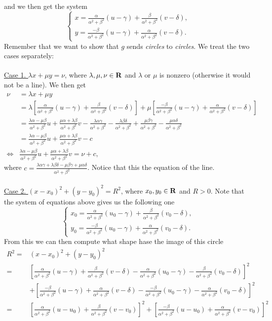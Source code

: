 \documentclass[11pt, a4paper, twoside]{article}
\begin{document}
	and we then get the system 
		$$\begin{cases}
			x = \frac{\alpha}{\alpha^2+\beta^2}(u-\gamma)+\frac{\beta}{\alpha^2+\beta^2}(v-\delta),\\
			y = \frac{-\beta}{\alpha^2+\beta^2}(u-\gamma)+\frac{\alpha}{\alpha^2+\beta^2}(v-\delta).
			\end{cases}$$
	Remember that we want to show that $g$ sends \emph{circles} to \emph{circles}. We treat the two cases separately:\\\\
	\underline{Case 1. $\lambda x+ \mu y = \nu$}, where $\lambda,\mu,\nu\in\mathbf{R}$ and $\lambda$ or $\mu$ is nonzero (otherwise it would not be a line). We then get
		\begin{align*}
			\nu&= \lambda x+\mu y\\
				&=\lambda[\frac{\alpha}{\alpha^2+\beta^2}(u-\gamma)+\frac{\beta}{\alpha^2+\beta^2}(v-\delta)]+\mu[\frac{-\beta}{\alpha^2+\beta^2}(u-\gamma)+\frac{\alpha}{\alpha^2+\beta^2}(v-\delta)]\\
			     &= \frac{\lambda\alpha-\mu\beta}{\alpha^2+\beta^2}u+\frac{\mu\alpha+\lambda\beta}{\alpha^2+\beta^2}v-\frac{\lambda\alpha\gamma}{\alpha^2+\beta^2}-\frac{\lambda\beta\delta}{\alpha^2+\beta^2}+\frac{\mu\beta\gamma}{\alpha^2+\beta^2}-\frac{\mu\alpha\delta}{\alpha^2+\beta^2}\\
			     &= \frac{\lambda\alpha-\mu\beta}{\alpha^2+\beta^2}u+\frac{\mu\alpha+\lambda\beta}{\alpha^2+\beta^2}v-c\\
			\iff&\frac{\lambda\alpha-\mu\beta}{\alpha^2+\beta^2}u+\frac{\mu\alpha+\lambda\beta}{\alpha^2+\beta^2}v=\nu+c,
		\end{align*}
		where $c=\frac{\lambda\alpha\gamma+\lambda\beta\delta-\mu\beta\gamma+\mu\alpha\delta}{\alpha^2+\beta^2}$. Notice that this the equation of the line.\\\\
	\underline{Case 2. $(x-x_0)^2+(y-y_0)^2=R^2$}, where $x_0,y_0\in\mathbf{R}$ and $R>0$. Note that the system of equations above gives us the following one 
		$$\begin{cases}
			x_0 = \frac{\alpha}{\alpha^2+\beta^2}(u_0-\gamma)+\frac{\beta}{\alpha^2+\beta^2}(v_0-\delta),\\
			y_0 = \frac{-\beta}{\alpha^2+\beta^2}(u_0-\gamma)+\frac{\alpha}{\alpha^2+\beta^2}(v_0-\delta).
			\end{cases}$$
		From this we can then compute what shape hase the image of this circle
		\begin{align*}
			R^2=& (x-x_0)^2+(y-y_0)^2\\
				=& [\frac{\alpha}{\alpha^2+\beta^2}(u-\gamma)+\frac{\beta}{\alpha^2+\beta^2}(v-\delta)-\frac{\alpha}{\alpha^2+\beta^2}(u_0-\gamma)-\frac{\beta}{\alpha^2+\beta^2}(v_0-\delta)]^2\\
				& + [\frac{-\beta}{\alpha^2+\beta^2}(u-\gamma)+\frac{\alpha}{\alpha^2+\beta^2}(v-\delta)-\frac{-\beta}{\alpha^2+\beta^2}(u_0-\gamma)-\frac{\alpha}{\alpha^2+\beta^2}(v_0-\delta)]^2\\
				=& [\frac{\alpha}{\alpha^2+\beta^2}(u-u_0)+\frac{\beta}{\alpha^2+\beta^2}(v-v_0)]^2+[\frac{-\beta}{\alpha^2+\beta^2}(u-u_0)+\frac{\alpha}{\alpha^2+\beta^2}(v-v_0)]^2
		\end{align*}
\end{document}
